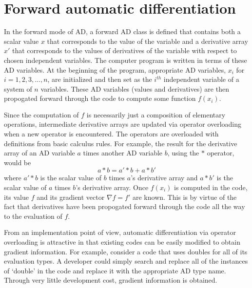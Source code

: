 \documentclass{article}
\begin{document}
\section{Forward automatic differentiation}
In the forward mode of AD, a forward AD class is defined that contains both
a scalar value $x$ that corresponds to the value of the variable and a
derivative array $x'$ that corresponds to the values of derivatives of the
variable with respect to chosen independent variables. The computer program is
written in terms of these AD variables. At the beginning of the program,
appropriate AD variables, $x_i$ for $i = 1,2,3,...,n$, are initialized and
then set as the $i^{th}$ independent variable of a system of $n$ variables.
These AD variables (values and derivatives) are then propogated forward through
the code to compute some function $f(x_i)$.

Since the computation of $f$ is necessarily just a composition of elementary
operations, intermediate derivative arrays are updated via operator
overloading when a new operator is encountered. The operators are overloaded
with definitions from basic calculus rules. For example, the result for the
derivative array of an AD variable $a$ times another AD variable $b$, using
the $*$ operator, would be
\[
a*b = a'*b + a * b'
\]
where $a'*b$ is the scalar value of $b$ times $a$'s derivative array and
$a * b'$ is the scalar value of $a$ times $b$'s derivative array. Once
$f(x_i)$ is computed in the code, its value $f$ and its gradient vector
$\nabla f = f'$ are known. This is by virtue of the fact that derivatives
have been propogated forward through the code all the way to the evaluation
of $f$.

From an implementation point of view, automatic differentiation via
operator overloading is attractive in that existing codes can be easily
modified to obtain gradient information. For example, consider a code that
uses doubles for all of its evaluation types. A developer could simply
search and replace all of the instances of `double' in the code and replace
it with the appropriate AD type name. Through very little development
cost, gradient information is obtained.

\newpage
\end{document}

